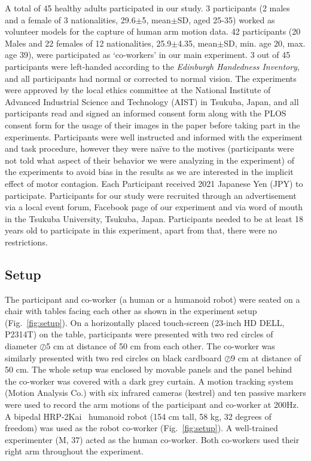 A total of 45 healthy adults participated in our study. 3 participants (2 males and a female of 3 nationalities, 29.6$\pm$5, mean$\pm$SD, aged 25-35) worked as volunteer models for the capture of human arm motion data. 42 participants (20 Males and 22 females of 12 nationalities, 25.9$\pm$4.35, mean$\pm$SD, min. age 20, max. age 39), were participated as `co-workers' in our main experiment. 3 out of 45 participants were left-handed according to the {\it Edinburgh Handedness Inventory}, and all participants had normal or corrected to normal vision. The experiments were approved by the local ethics committee at the National Institute of Advanced Industrial Science and Technology (AIST) in Tsukuba, Japan, and all participants read and signed an informed consent form along with the PLOS consent form for the usage of their images in the paper before taking part in the experiments. Participants were well instructed and informed with the experiment and task procedure, however they were na\"ive to the motives (participants were not told what aspect of their behavior we were analyzing in the experiment) of the experiments to avoid bias in the results as we are interested in the implicit effect of motor contagion. Each Participant received 2021 Japanese Yen (JPY) to participate. 
Participants for our study were recruited through an advertisement via a local event forum, Facebook page of our experiment and via word of mouth in the Tsukuba University, Tsukuba, Japan. Participants needed to be at least 18 years old to participate in this experiment, apart from that, there were no restrictions.

\subsection{Setup}

The participant and co-worker (a human or a humanoid robot) were seated on a chair with tables facing each other as shown in the experiment setup (Fig.~\ref{fig:setup}). On a horizontally placed touch-screen (23-inch HD DELL, P2314T) on the table, participants were presented with two red circles of diameter $\oslash$5 cm at distance of 50 cm from each other. The co-worker was similarly presented with two red circles on black cardboard $\oslash$9 cm at distance of 50 cm. The whole setup was enclosed by movable panels and the panel behind the co-worker was covered with a dark grey curtain. A motion tracking system (Motion Analysis Co.) with six infrared cameras (kestrel) and ten passive markers were used to record the arm motions of the participant and co-worker at 200Hz. A bipedal HRP-2Kai~\cite{Kaneko:RAS_ICHR:2015} humanoid robot (154 cm tall, 58 kg, 32 degrees of freedom) was used as the robot co-worker (Fig.~\ref{fig:setup}). A well-trained experimenter (M, 37) acted as the human co-worker. Both co-workers used their right arm throughout the experiment.

